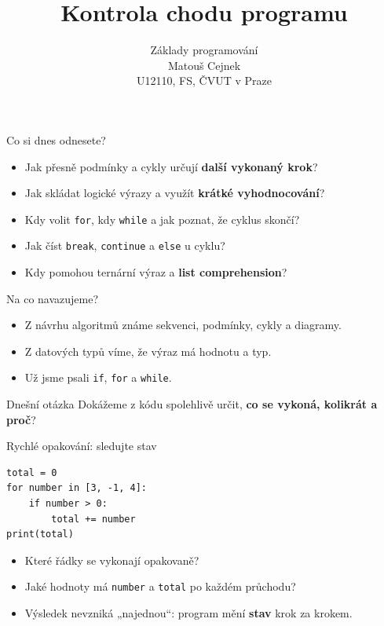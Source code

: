 \documentclass[aspectratio=169,t]{beamer}
\title{Kontrola chodu programu}
\subtitle{Základy programování\\Matouš Cejnek\\U12110, FS, ČVUT v Praze}
\author{}
\institute{}
\date{}
\newcommand{\term}[1]{\textcolor{CodeBlue}{\textbf{#1}}}
\begin{document}
\begin{frame}
  \clearpage\thispagestyle{empty}\titlepage
\end{frame}

\begin{frame}{Co si dnes odnesete?}
  \begin{itemize}
    \item Jak přesně podmínky a cykly určují \term{další vykonaný krok}?
    \item Jak skládat logické výrazy a využít \term{krátké vyhodnocování}?
    \item Kdy volit \texttt{for}, kdy \texttt{while} a jak poznat, že cyklus skončí?
    \item Jak číst \texttt{break}, \texttt{continue} a \texttt{else} u cyklu?
    \item Kdy pomohou ternární výraz a \term{list comprehension}?
  \end{itemize}
\end{frame}

\begin{frame}{Na co navazujeme?}
  \begin{itemize}
    \item Z návrhu algoritmů známe sekvenci, podmínky, cykly a diagramy.
    \item Z datových typů víme, že výraz má hodnotu a typ.
    \item Už jsme psali \texttt{if}, \texttt{for} a \texttt{while}.
  \end{itemize}
  \begin{block}{Dnešní otázka}
    Dokážeme z kódu spolehlivě určit, \textbf{co se vykoná, kolikrát a proč}?
  \end{block}
\end{frame}

\begin{frame}[fragile]{Rychlé opakování: sledujte stav}
\begin{lstlisting}[style=python]
total = 0
for number in [3, -1, 4]:
    if number > 0:
        total += number
print(total)
\end{lstlisting}
  \begin{itemize}
    \item Které řádky se vykonají opakovaně?
    \item Jaké hodnoty má \texttt{number} a \texttt{total} po každém průchodu?
    \item Výsledek nevzniká „najednou“: program mění \term{stav} krok za krokem.
  \end{itemize}
\end{frame}
\end{document}
